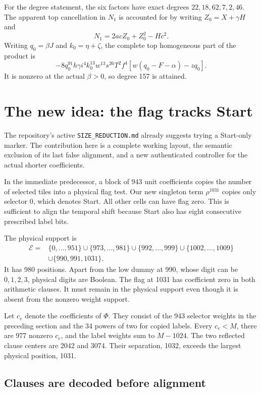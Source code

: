 \documentclass[10pt,letterpaper]{article}
\theoremstyle{remark}\newtheorem{remark}[theorem]{Remark}
\begin{document}
For the degree statement, the six factors have exact degrees
$22,18,62,7,2,46$. The apparent top cancellation in $N_1$ is accounted for
by writing $Z_0=X+\gamma H$ and
\[
 N_1=2acZ_0+Z_0^2-Hc^2.
\]
Writing $q_0=\beta J$ and $k_0=\eta+\zeta$, the complete top homogeneous
part of the product is
\[
 -8q_0^{91}h\gamma i^4k_0^{13}w^{13}s^{26}T^2f^4
       [w(q_0-F-\alpha)-zq_0].
\]
It is nonzero at the actual $\beta>0$, so degree 157 is attained.

\section{The new idea: the flag tracks Start}
\label{sec:native}

The repository's active \texttt{SIZE\_REDUCTION.md} already suggests trying
a Start-only marker. The contribution here is a complete working layout,
the semantic exclusion of its last false alignment, and a new authenticated
controller for the actual shorter coefficients.

In the immediate predecessor, a block of 943 unit coefficients copies the
number of selected tiles into a physical flag test. Our new singleton term
$\rho^{1031}$ copies only selector 0, which denotes Start. All other cells
can have flag zero. This is sufficient to align the temporal shift because
Start also has eight consecutive prescribed label bits.

The physical support is
\[
 \begin{split}
 \mathcal E={}&\{0,\ldots,951\}\cup\{973,\ldots,981\}
 \cup\{992,\ldots,999\}\cup\{1002,\ldots,1009\}\\
 &\cup\{990,991,1031\}.
 \end{split}
\]
It has 980 positions. Apart from the low dummy at 990, whose digit can be
$0,1,2,3$, physical digits are Boolean. The flag at 1031 has coefficient
zero in both arithmetic clauses. It must remain in the physical support
even though it is absent from the nonzero weight support.

Let $c_e$ denote the coefficients of $\Phi$. They consist of the 943
selector weights in the preceding section and the 34 powers of two for
copied labels. Every $c_e<M$, there are 977 nonzero $c_e$, and the label
weights sum to $M-1024$. The two reflected clause centers are 2042 and 3074.
Their separation, 1032, exceeds the largest physical position, 1031.

\subsection{Clauses are decoded before alignment}
\end{document}

